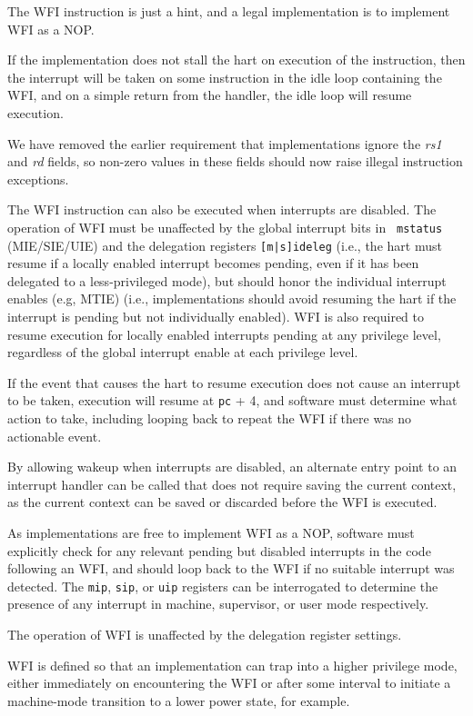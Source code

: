 The WFI instruction is just a hint, and a legal implementation is to
implement WFI as a NOP.

\begin{commentary}
If the implementation does not stall the hart on execution of the
instruction, then the interrupt will be taken on some instruction in
the idle loop containing the WFI, and on a simple return from the
handler, the idle loop will resume execution.
\end{commentary}

\begin{commentary}
We have removed the earlier requirement that implementations ignore
the {\em rs1} and {\em rd} fields, so non-zero values in these fields
should now raise illegal instruction exceptions.
\end{commentary}

The WFI instruction can also be executed when interrupts are disabled.  The
operation of WFI must be unaffected by the global interrupt bits in {\tt
mstatus} (MIE/SIE/UIE) and the delegation registers {\tt [m|s]ideleg}
(i.e., the hart must resume if a locally enabled interrupt becomes pending,
even if it has been delegated to a less-privileged mode), but should honor the
individual interrupt enables (e.g, MTIE) (i.e., implementations should
avoid resuming the hart if the interrupt is pending but not
individually enabled).  WFI is also required to resume execution for
locally enabled interrupts pending at any privilege level, regardless
of the global interrupt enable at each privilege level.

If the event that causes the hart to resume execution does not cause
an interrupt to be taken, execution will resume at {\tt pc} + 4, and
software must determine what action to take, including looping back to
repeat the WFI if there was no actionable event.

\begin{commentary}
By allowing wakeup when interrupts are disabled, an alternate entry
point to an interrupt handler can be called that does not require
saving the current context, as the current context can be saved or
discarded before the WFI is executed.

As implementations are free to implement WFI as a NOP, software must
explicitly check for any relevant pending but disabled interrupts in
the code following an WFI, and should loop back to the WFI if no
suitable interrupt was detected.  The {\tt mip}, {\tt sip},
or {\tt uip} registers can be interrogated to determine the presence
of any interrupt in machine, supervisor, or user mode
respectively.

The operation of WFI is unaffected by the delegation register settings.

WFI is defined so that an implementation can trap into a higher
privilege mode, either immediately on encountering the WFI or after
some interval to initiate a machine-mode transition to a lower power
state, for example.
\end{commentary}

